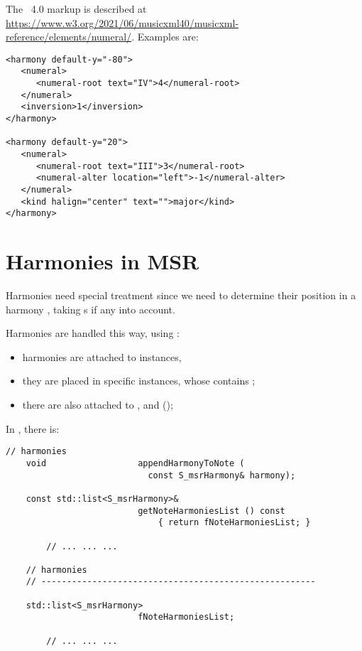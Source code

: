 The \mxml\ 4.0  markup is described at \url{https://www.w3.org/2021/06/musicxml40/musicxml-reference/elements/numeral/}.
Examples are:
\begin{lstlisting}[language=MusicXML]
<harmony default-y="-80">
   <numeral>
      <numeral-root text="IV">4</numeral-root>
   </numeral>
   <inversion>1</inversion>
</harmony>

<harmony default-y="20">
   <numeral>
      <numeral-root text="III">3</numeral-root>
      <numeral-alter location="left">-1</numeral-alter>
   </numeral>
   <kind halign="center" text="">major</kind>
</harmony>
\end{lstlisting}


\section{Harmonies in MSR}

Harmonies need special treatment since we need to determine their position in a harmony , taking
s if any into account.

Harmonies are handled this way, using \denorm:
\begin{itemize}
\item harmonies are attached to  instances,
\item they are placed in specific  instances, whose  contains ;
\item there are also attached to ,  and  (\denorm);
\end{itemize}

In , there is:
\begin{lstlisting}[language=CPlusPlus]
    // harmonies
    void                  appendHarmonyToNote (
                            const S_msrHarmony& harmony);

    const std::list<S_msrHarmony>&
                          getNoteHarmoniesList () const
                              { return fNoteHarmoniesList; }

		// ... ... ...

    // harmonies
    // ------------------------------------------------------

    std::list<S_msrHarmony>
                          fNoteHarmoniesList;

		// ... ... ...
\end{lstlisting}


